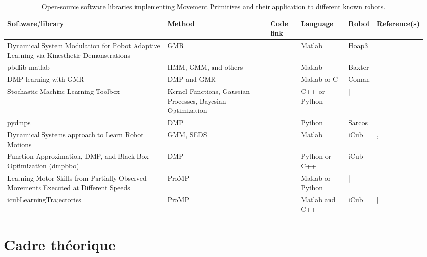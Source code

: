 \documentclass[utf8]{frontiersSCNS} %
\begin{document}
\begin{table}
\begin{center}
\begin{tabular}{|p{5.5cm}|p{3cm}|p{2cm}|p{1.5cm}|p{2cm}| p{2cm}|}
  \hline
  \textbf{Software/library} & \textbf{Method} & \textbf{Code link} & \textbf{Language} & \textbf{Robot} & \textbf{Reference(s)}\tabularnewline
  \hline
Dynamical System Modulation for Robot Adaptive Learning via Kinesthetic Demonstrations & GMR & \cite{gmr} & Matlab & Hoap3 & \cite{hersch2008dynamical}\tabularnewline
  \hline
pbdlib-matlab & HMM, GMM, and others & \cite{pbdlib} & Matlab & Baxter & \cite{Calinon16JIST} \tabularnewline
  \hline
DMP learning with GMR  & DMP and GMR & \cite{StatisticalDynamical}  & Matlab or C & Coman & \cite{Calinon12Hum} \tabularnewline
\hline
Stochastic Machine Learning Toolbox & Kernel Functions, Gaussian Processes, Bayesian Optimization & \cite{smlt} & C++ or Python &  | & \tabularnewline
\hline
  pydmps & DMP & \cite{pydmps} & Python & Sarcos & \cite{ijspeert2013dynamical}\tabularnewline
  \hline
   Dynamical Systems approach to Learn Robot Motions & GMM, SEDS & \cite{seds} & Matlab & iCub & \cite{khansari2011learning}, \cite{khansari2012dynamical} \tabularnewline
  \hline

Function Approximation, DMP, and Black-Box Optimization (dmpbbo) &  DMP  & \cite{dmpbbo} & Python or C++ & iCub & \cite{lober2014multiple,2013ACTI2891} \tabularnewline
  \hline  
  Learning Motor Skills from Partially Observed Movements Executed at Different Speeds & ProMP & \cite{marcoProg} & Matlab or Python & | & \cite{ewerton2015learning}\tabularnewline
  \hline
\rowcolor{yellow} icubLearningTrajectories & ProMP & \cite{icubLearningTrajectories} & Matlab and C++ & iCub & | \tabularnewline
\hline
\end{tabular}
\end{center}

\label{table:software}
\caption{Open-source software libraries implementing Movement Primitives and their application to different known robots.}
\end{table}



\section{Cadre théorique}
\label{sec:theory}
\end{document}
